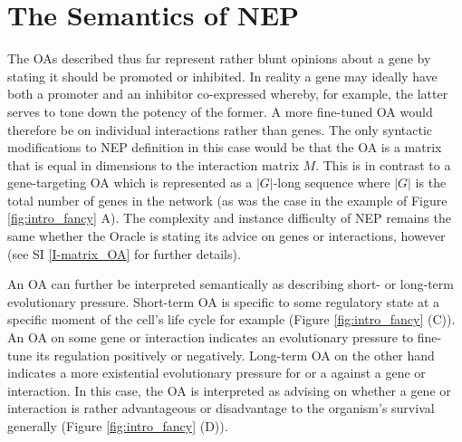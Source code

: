 \section{The Semantics of NEP}\label{sup_semantics}
      The OAs described thus far represent rather blunt opinions about a gene by stating it should be promoted or inhibited. In reality a gene may ideally have both a promoter and an inhibitor co-expressed whereby, for example, the latter serves to tone down the potency of the former. A more fine-tuned OA would therefore be on individual interactions rather than genes. The only syntactic modifications to NEP definition in this case would be that the OA is a matrix that is equal in dimensions to the interaction matrix $M$. This is in contrast to a gene-targeting OA which is represented as a $|G|$-long sequence where $|G|$ is the total number of genes in the network (as was the case in the example of Figure \ref{fig:intro_fancy} A). The complexity and instance difficulty of NEP remains the same whether the Oracle is stating its advice on genes or interactions, however (see SI \ref{I-matrix_OA} for further details).
      

			An OA can further be interpreted semantically as describing short- or long-term evolutionary pressure. Short-term OA is specific to some regulatory state at a specific moment of the cell's life cycle for example (Figure \ref{fig:intro_fancy} (C)). An OA on some gene or interaction indicates an evolutionary pressure to fine-tune its regulation positively or negatively. Long-term OA on the other hand indicates a more existential evolutionary pressure for or a against a gene or interaction. In this case, the OA is interpreted as advising on whether a gene or interaction is rather advantageous or disadvantage to the organism's survival generally (Figure \ref{fig:intro_fancy} (D)).
